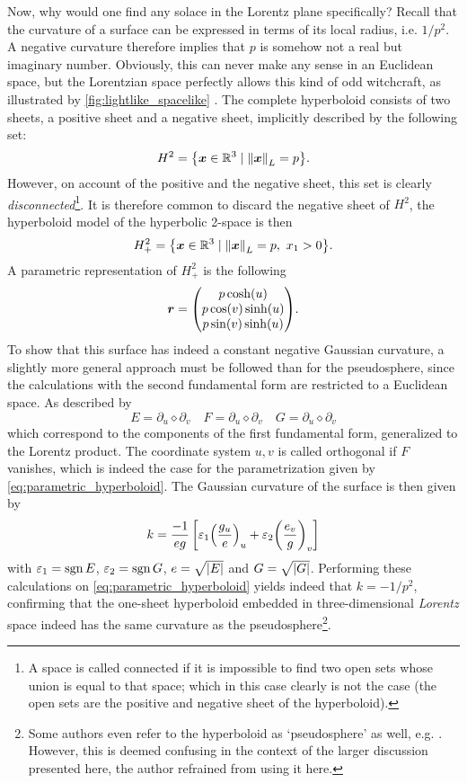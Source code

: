 Now, why would one find any solace in the Lorentz plane specifically? Recall that the curvature of a surface can be expressed in terms of its local radius, i.e. \(1/p^2\). A negative curvature therefore implies that \(p\) is somehow not a real but imaginary number. Obviously, this can never make any sense in an Euclidean space, but the Lorentzian space perfectly allows this kind of odd witchcraft, as illustrated by \cref{fig:lightlike_spacelike} \cite{Ratcliffe2019}. The complete hyperboloid consists of two sheets, a positive sheet and a negative sheet, implicitly described by the following set: 
\[ H^2 = \qty{\vec{x} \in \real^3 \mid \lnorm{\vec{x}} = p}. \]
However, on account of the positive and the negative sheet, this set is clearly \emph{disconnected}\footnote{A space is called connected if it is impossible to find two open sets whose union is equal to that space; which in this case clearly is not the case (the open sets are the positive and negative sheet of the hyperboloid).}. It is therefore common to discard the negative sheet of \(H^2\), the hyperboloid model of the hyperbolic 2-space is then \cite{Ratcliffe2019}
\[ H^2_+ = \qty{\vec{x} \in \real^3 \mid \lnorm{\vec{x}} = p,\ x_1 > 0}. \]
A parametric representation of \(H^2_+\) is the following
\begin{equation}
    \vec{r} = \mqty(p\cosh(u)\\p\cos(v)\sinh(u)\\p\sin(v)\sinh(u)).
    \label{eq:parametric_hyperboloid}
\end{equation}
To show that this surface has indeed a constant negative Gaussian curvature, a slightly more general approach must be followed than for the pseudosphere, since the calculations with the second fundamental form are restricted to a Euclidean space. As described by \citet{ONeill1983}
\[ E = \partial_u \diamond \partial_v \quad F = \partial_u \diamond \partial_v \quad G = \partial_u \diamond \partial_v \]
which correspond to the components of the first fundamental form, generalized to the Lorentz product. The coordinate system \(u, v\) is called orthogonal if \(F\) vanishes, which is indeed the case for the parametrization given by \cref{eq:parametric_hyperboloid}.
The Gaussian curvature of the surface is then given by \cite{ONeill1983}
\begin{equation}
    k = \frac{-1}{eg}\left[\varepsilon_1\qty(\frac{g_u}{e})_u + \varepsilon_2\qty(\frac{e_v}{g})_v\right]
    \label{eq:orthogonal_gaussian_curvature}
\end{equation}
with \(\varepsilon_1 = \operatorname{sgn}{E}\), \(\varepsilon_2 = \operatorname{sgn}{G}\), \(e = \sqrt{\abs{E}}\) and \(G = \sqrt{\abs{G}}\).
Performing these calculations on \cref{eq:parametric_hyperboloid} yields indeed that \(k = -1/p^2\), confirming that the one-sheet hyperboloid embedded in three-dimensional \emph{Lorentz} space indeed has the same curvature as the pseudosphere\footnote{Some authors even refer to the hyperboloid as `pseudosphere' as well, e.g. \citet{Balazs1986}. However, this is deemed confusing in the context of the larger discussion presented here, the author refrained from using it here.}.

